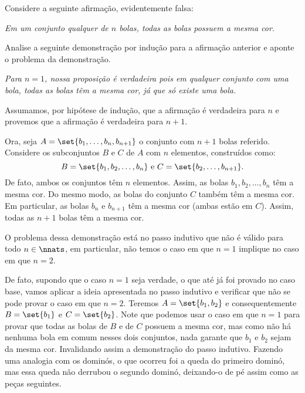 \begin{example}
Considere a seguinte afirmação, evidentemente falsa:

\textit{Em um conjunto qualquer de $n$ bolas, todas as bolas possuem a mesma cor}.

Analise a seguinte demonstração por indução para a afirmação anterior e aponte o problema da demonstração.

{\it Para $n=1$, nossa proposição é verdadeira pois em qualquer conjunto com uma bola, todas as bolas têm a mesma cor, já que só existe uma bola. 

Assumamos, por hipótese de indução, que a afirmação é verdadeira para $n$ e provemos que a afirmação é verdadeira para
$n+1$.

Ora, seja $A = \set {b_1, \dots, b_n, b_{n+1}}$ o conjunto  com $n+1$ bolas referido. Considere os subconjuntos $B$ e $C$ de $A$ com $n$ elementos, construídos como:
%
\begin{equation*}
B = \set {b_1, b_2, \dots, b_n} \text{ e } C= \set{ b_2, \dots, b_{n+1}}.
\end{equation*}
%
De fato, ambos os conjuntos têm $n$ elementos. Assim, as bolas $b_1, b_2, \dots , b_n$ têm a mesma cor. Do mesmo modo, as bolas do conjunto $C$ também têm a mesma cor. Em particular, as bolas $b_n$ e $b_{n+1}$ têm a mesma cor (ambas estão em $C$). Assim, todas as $n+1$ bolas têm a mesma cor.}
\begin{solution}
O problema dessa demonstração está no passo indutivo que não é válido para todo $n \in \nnats$, em particular, não temos o caso em que $n=1$ implique no caso em que $n=2$.

De fato, supondo que o caso $n=1$ seja verdade, o que até já foi provado no caso base, vamos aplicar a ideia apresentada no passo indutivo e verificar que não se pode provar o caso em que $n=2$. Teremos $A = \set {b_1, b_2}$ e consequentemente $B = \set {b_1}$ e $C = \set {b_2}$. Note que podemos usar o caso em que $n=1$ para provar que todas as bolas de $B$ e de $C$ possuem a mesma cor, mas como não há nenhuma bola em comum nesses dois conjuntos, nada garante que $b_1$ e $b_2$ sejam da mesma cor. Invalidando assim a demonstração do passo indutivo. Fazendo uma analogia com os dominós, o que ocorreu foi a queda do primeiro dominó, mas essa queda não derrubou o segundo dominó, deixando-o de pé assim como as peças seguintes.
\end{solution}
\end{example}